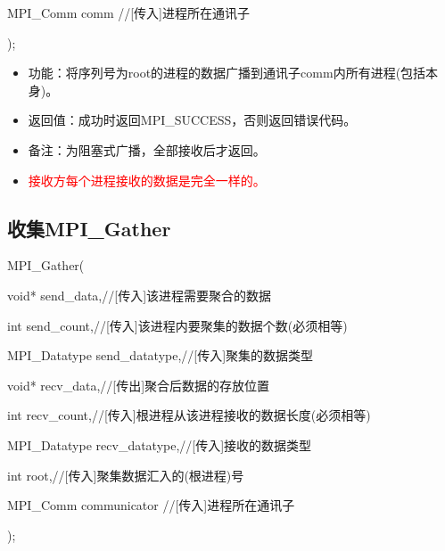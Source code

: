 \documentclass[UTF8]{article}%
\begin{document}
    \qquad MPI\_Comm comm //[传入]进程所在通讯子
    
);

\begin{itemize}
    \item 功能：将序列号为root的进程的数据广播到通讯子comm内所有进程(包括本身)。
    \item 返回值：成功时返回MPI\_SUCCESS，否则返回错误代码。
    \item 备注：为阻塞式广播，全部接收后才返回。
    \item \textcolor{red}{接收方每个进程接收的数据是完全一样的。}
\end{itemize}

\subsection{收集MPI\_Gather}

MPI\_Gather(

    \qquad void* send\_data,//[传入]该进程需要聚合的数据

    \qquad int send\_count,//[传入]该进程内要聚集的数据个数(必须相等)

    \qquad MPI\_Datatype send\_datatype,//[传入]聚集的数据类型

    \qquad void* recv\_data,//[传出]聚合后数据的存放位置

    \qquad int recv\_count,//[传入]根进程从该进程接收的数据长度(必须相等)

    \qquad MPI\_Datatype recv\_datatype,//[传入]接收的数据类型

    \qquad int root,//[传入]聚集数据汇入的(根进程)号

    \qquad MPI\_Comm communicator //[传入]进程所在通讯子
    
);
\end{document}
